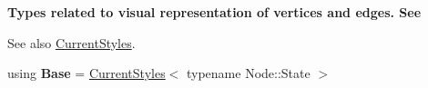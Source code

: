 \begin{Indent}{\bf Types related to visual representation of vertices and edges. See}\par
{\em \begin{DoxySeeAlso}{See also}
\hyperlink{structslb_1_1core_1_1ui_1_1CurrentStyles}{Current\+Styles}. 
\end{DoxySeeAlso}
}\begin{DoxyCompactItemize}
\item 
using {\bfseries Base} = \hyperlink{structslb_1_1core_1_1ui_1_1CurrentStyles}{Current\+Styles}$<$ typename Node\+::\+State $>$\hypertarget{structslb_1_1core_1_1ui_1_1VisualLog_a7bf26b8c852e9aad11ce048077696850}{}\label{structslb_1_1core_1_1ui_1_1VisualLog_a7bf26b8c852e9aad11ce048077696850}

\end{DoxyCompactItemize}
\end{Indent}
